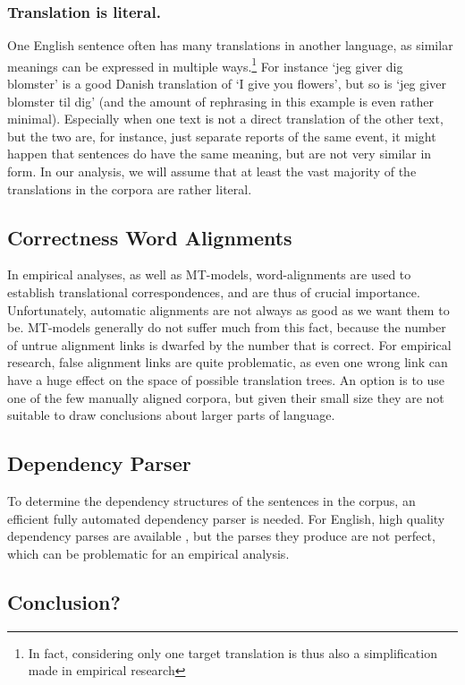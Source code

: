 \documentclass{report}
\begin{document}
\subsubsection{Translation is literal.}
One English sentence often has many translations in another language, as similar meanings can be expressed in multiple ways.\footnote{In fact, considering only one target translation is thus also a simplification made in empirical research} For instance `jeg giver dig blomster' is a good Danish translation of `I give you flowers', but so is `jeg giver blomster til dig' (and the amount of rephrasing in this example is even rather minimal). Especially when one text is not a direct translation of the other text, but the two are, for instance, just separate reports of the same event, it might happen that sentences do have the same meaning, but are not very similar in form. In our analysis, we will assume that at least the vast majority of the translations in the corpora are rather literal.
 
\subsection{Correctness Word Alignments}

In empirical analyses, as well as MT-models, word-alignments are used to establish translational correspondences, and are thus of crucial importance. Unfortunately, automatic alignments are not always as good as we want them to be. MT-models generally do not suffer much from this fact, because the number of untrue alignment links is dwarfed by the number that is correct. For empirical research, false alignment links are quite problematic, as even one wrong link can have a huge effect on the space of possible translation trees. An option is to use one of the few manually aligned corpora, but given their small size they are not suitable to draw conclusions about larger parts of language.

\subsection{Dependency Parser}

To determine the dependency structures of the sentences in the corpus, an efficient fully automated dependency parser is needed.  For English, high quality dependency parses are available \citep{cer2010parsing}, but the parses they produce are not perfect, which can be problematic for an empirical analysis.

\subsection{Conclusion?}
\end{document}
